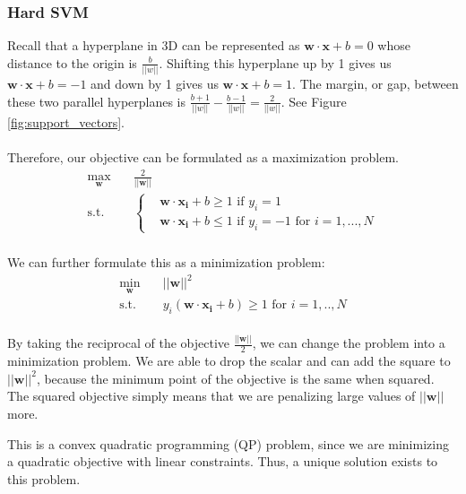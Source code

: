 \documentclass[11pt]{article}
\begin{document}
\subsubsection{Hard SVM}
Recall that a hyperplane in 3D can be represented as $\mathbf{w} \cdot \mathbf{x} + b = 0$ whose distance to the origin is $\frac{b}{||w||}$. Shifting this hyperplane up by 1 gives us $\mathbf{w} \cdot \mathbf{x} + b = -1$ and down by 1 gives us $\mathbf{w} \cdot \mathbf{x} + b = 1$. The margin, or gap, between these two parallel hyperplanes is $\frac{b+1}{||w||} - \frac{b-1}{||w||} = \frac{2}{||w||}$. See Figure \ref{fig:support_vectors}.
\\\\
Therefore, our objective can be formulated as a maximization problem.
\begin{equation}
\begin{aligned}
\max_{\mathbf{w}} \quad & \frac{2}{||\mathbf{w}||}\\
\textrm{s.t.} \quad &
\begin{cases}
& \mathbf{w} \cdot \mathbf{x_{i}} +b \geq 1 \text{ if } y_i = 1 \\
&\mathbf{w} \cdot \mathbf{x_{i}} +b \leq 1 \text{ if } y_i = -1 \text{ for } i = 1,..., N   
  \end{cases}\\
\end{aligned}
\end{equation}

We can further formulate this as a minimization problem:
\begin{equation}
\begin{aligned}
\min_{\mathbf{w}} \quad & ||\mathbf{w}||^2\\
\textrm{s.t.} \quad &
 y_i(\mathbf{w} \cdot \mathbf{x_{i}} +b) \geq 1 \text{ for } i = 1, .., N\\
\end{aligned}
\end{equation}

By taking the reciprocal of the objective $\frac{||\mathbf{w}||}{2}$, we can change the problem into a minimization problem. We are able to drop the scalar and can add the square to $||\mathbf{w}||^2$, because the minimum point of the objective is the same when squared. The squared objective simply means that we are penalizing large values of $||\mathbf{w}||$ more.

This is a convex quadratic programming (QP) problem, since we are minimizing a quadratic objective with linear constraints. Thus, a unique solution exists to this problem. 
\end{document}
